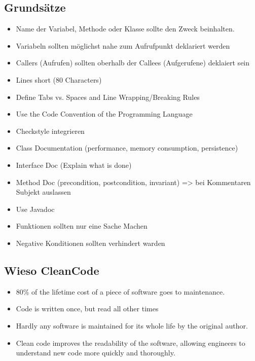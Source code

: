 \documentclass[10pt]{article}
\begin{document}
    \subsection{Grunds\"atze}
    \begin{itemize}
        \item Name der Variabel, Methode oder Klasse sollte den Zweck beinhalten.
        \item Variabeln sollten m\"oglichst nahe zum Aufrufpunkt deklariert werden
        \item Callers (Aufrufen) sollten oberhalb der Callees (Aufgerufene) deklaiert sein
        \item Lines short (80 Characters)
        \item Define Tabs vs. Spaces and Line Wrapping/Breaking Rules
        \item Use the Code Convention of the Programming Language
        \item Checkstyle integrieren
        \item Class Documentation (performance, memory consumption, persistence)
        \item Interface Doc (Explain what is done)
        \item Method Doc (precondition, postcondition, invariant) => bei Kommentaren Subjekt auslassen
        \item Use Javadoc
        \item Funktionen sollten nur eine Sache Machen
        \item Negative Konditionen sollten verhindert warden
    \end{itemize}

    \subsection{Wieso CleanCode}
    \begin{itemize}
        \item 80\% of the lifetime cost of a piece of software goes to maintenance.
        \item Code is written once, but read all other times
        \item Hardly any software is maintained for its whole life by the original author.
        \item Clean code improves the readability of the software, allowing engineers to understand new code more quickly and thoroughly.
    \end{itemize}
\end{document}
